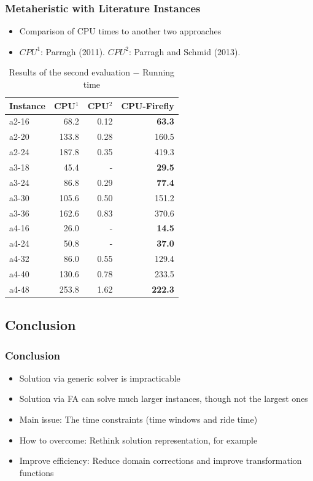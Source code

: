 \documentclass{beamer}
\begin{document}
\begin{frame}
\frametitle{Metaheristic with Literature Instances}
\begin{itemize}
\item Comparison of CPU times to another two approaches
\item $CPU^1$: Parragh (2011). $CPU^2$: Parragh and Schmid (2013).
\end{itemize}
\begin{table}[H]
\centering
\caption{Results of the second evaluation $-$ Running time}
\scriptsize
{}
\begin{tabular}{l | r | r | r}
\hline
Instance & CPU$^1$ & CPU$^2$ & CPU-Firefly\\
\hline
a2-16 & 	68.2 	& 	0.12 & 	\textbf{63.3} \\
a2-20 & 	133.8 	& 	0.28 & 	160.5 \\
a2-24 & 	187.8 	& 	0.35 & 	419.3 \\
a3-18 & 	45.4 	& 	- & 	\textbf{29.5} \\
a3-24 & 	86.8 	& 	0.29 & 	\textbf{77.4} \\
a3-30 & 	105.6 	& 	0.50 & 	151.2 \\
a3-36 & 	162.6 	& 	0.83 & 	370.6 \\
a4-16 & 	26.0 	& 	- & 	\textbf{14.5} \\
a4-24 & 	50.8 	& 	- & 	\textbf{37.0} \\
a4-32 & 	86.0 		& 	0.55 & 	129.4 \\
a4-40 & 	130.6 	& 	0.78 & 	233.5 \\
a4-48 & 	253.8 	& 	1.62 & 	\textbf{222.3} \\
\hline
\end{tabular}
\end{table}
\end{frame}

\subsection{Conclusion}
\begin{frame}
\frametitle{Conclusion}
\begin{itemize}
\item Solution via generic solver is impracticable
\item Solution via FA can solve much larger instances, though not the largest ones
\item Main issue: The time constraints (time windows and ride time)
\item How to overcome: Rethink solution representation, for example
\item Improve efficiency: Reduce domain corrections and improve transformation functions
\end{itemize}
\end{frame}
\end{document}

